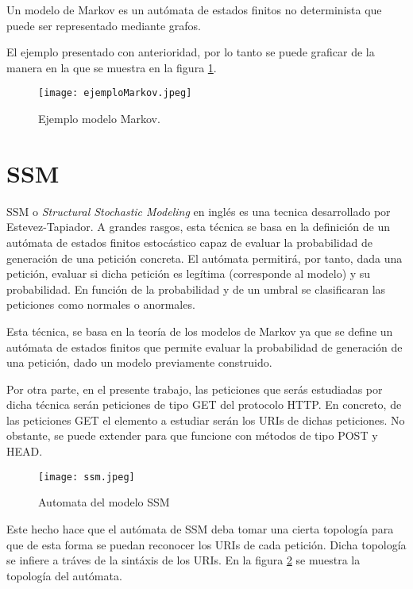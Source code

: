 Un modelo de Markov es un autómata de estados finitos no determinista que puede ser representado mediante grafos.

El ejemplo presentado con anterioridad, por lo tanto se puede graficar de la manera en la que se muestra en la figura \ref{fig:modeloMarkov}.

\begin{figure}[tb]
\begin{center}
\texttt{[image: ejemploMarkov.jpeg]}
\caption{Ejemplo modelo Markov.}
\label{fig:modeloMarkov}
\end{center}
\end{figure}


\section{SSM}\label{sec:modeloSSM}

SSM o \textit{Structural Stochastic Modeling} en ingl\'es es una tecnica desarrollado por Estevez-Tapiador. A grandes rasgos, esta t\'ecnica se basa en la definición de un autómata de estados finitos estocástico capaz de evaluar la probabilidad de generación de una petición concreta. El autómata permitirá, por tanto, dada una petición, evaluar si dicha petición es legítima (corresponde al modelo) y su probabilidad. En función de la probabilidad y de un umbral se clasificaran las peticiones como normales o anormales.\cite{ssm}

Esta t\'ecnica, se basa en la teor\'ia de los modelos de Markov ya que se define un autómata de estados finitos que permite evaluar la probabilidad de generaci\'on de una petici\'on, dado un modelo previamente construido.

Por otra parte, en el presente trabajo, las peticiones que ser\'as estudiadas por dicha t\'ecnica ser\'an peticiones de tipo GET del protocolo HTTP. En concreto, de las peticiones GET el elemento a estudiar ser\'an los URIs de dichas peticiones. No obstante, se puede extender para que funcione con m\'etodos de tipo POST y HEAD. 

\begin{figure}
\begin{center}
  \texttt{[image: ssm.jpeg]}
  \caption{Automata del modelo SSM}
  \label{fig:ssm}
\end{center}

\end{figure}

Este hecho hace que el autómata de SSM deba tomar una cierta topolog\'ia para que de esta forma se puedan reconocer los URIs de cada petici\'on. Dicha topolog\'ia se infiere a tráves de la sint\'axis de los URIs. En la figura \ref{fig:ssm} se muestra la topolog\'ia del autómata.

